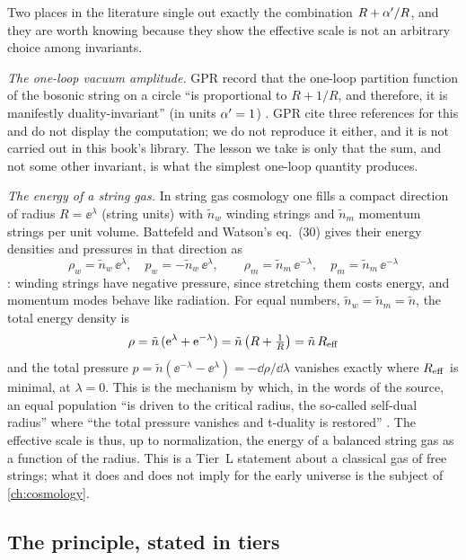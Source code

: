 Two places in the literature single out exactly the combination $R+\alpha'/R$, and they are worth
knowing because they show the effective scale is not an arbitrary choice among invariants.

\begin{physicsbox}
\emph{The one-loop vacuum amplitude.} GPR record that the one-loop partition function of the
bosonic string on a circle ``is proportional to $R+1/R$, and therefore, it is manifestly
duality-invariant'' (in units $\alpha'=1$) . GPR cite three
references for this and do not display the computation; we do not reproduce it either, and it
is not carried out in this book's library. The lesson we take is only that the sum, and not
some other invariant, is what the simplest one-loop quantity produces.

\emph{The energy of a string gas.} In string gas cosmology one fills a compact direction of
radius $R=\ee^{\lambda}$ (string units) with $\tilde n_w$ winding strings and $\tilde n_m$
momentum strings per unit volume. Battefeld and Watson's eq.~(30) gives their energy densities
and pressures in that direction as
\[
 \rho_w=\tilde n_w\,\ee^{\lambda},\quad p_w=-\tilde n_w\,\ee^{\lambda},\qquad
 \rho_m=\tilde n_m\,\ee^{-\lambda},\quad p_m=\tilde n_m\,\ee^{-\lambda}
\]
: winding strings have negative pressure, since
stretching them costs energy, and momentum modes behave like radiation. For equal numbers,
$\tilde n_w=\tilde n_m=\tilde n$, the total energy density is
\[
 \rho=\tilde n\,(\mathrm{e}^{\lambda}+\mathrm{e}^{-\lambda})=\tilde n\,\big(R+\tfrac1R\big)=\tilde n\,R_{\rm eff}
\]
and the total pressure $p=\tilde n(\ee^{-\lambda}-\ee^{\lambda})=-\dd\rho/\dd\lambda$ vanishes
exactly where $R_{\rm eff}$ is minimal, at $\lambda=0$. This is the mechanism by which, in the
words of the source, an equal population ``is driven to the critical radius, the so-called
self-dual radius'' where ``the total pressure vanishes and t-duality is restored''
. The effective scale is thus, up to normalization, the energy
of a balanced string gas as a function of the radius. This is a Tier~L statement about a
classical gas of free strings; what it does and does not imply for the early universe is the
subject of \cref{ch:cosmology}.
\end{physicsbox}

\subsection{The principle, stated in tiers}

